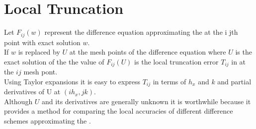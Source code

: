 \section{Local Truncation}
Let $F_{ij}(w)$ represent the difference equation approximating the  at the 
i jth point with exact solution $w$.\\
If $w$ is replaced by $U$ at the mesh points of the difference equation where $U$ is the exact solution of the  the value of $F_{ij}(U)$ is the local truncation
error $T_{ij}$ in at the $i j$ mesh pont.\\
Using Taylor expansions it is easy to express $T_{ij}$ in terms of $h_{x}$ and $k$ and partial derivatives of U at $(ih_x,jk)$.\\
Although $U$ and its derivatives are generally unknown it is worthwhile because
it provides a method for comparing the local accuracies of different difference schemes approximating the .
